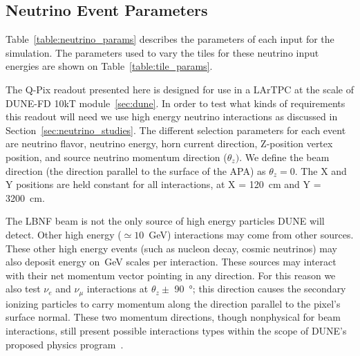 \subsection{Neutrino Event Parameters}

Table~\ref{table:neutrino_params} describes the parameters of each input for the simulation.
The parameters used to vary the tiles for these neutrino input energies are shown on Table~\ref{table:tile_params}.

The Q-Pix readout presented here is designed for use in a LArTPC at the scale of DUNE-FD 10kT module~\ref{sec:dune}.
In order to test what kinds of requirements this readout will need we use high energy neutrino interactions as discussed in Section~\ref{sec:neutrino_studies}.
The different selection parameters for each event are neutrino flavor, neutrino energy, horn current direction, Z-position vertex position, and source neutrino momentum direction ($\theta_{z})$.
We define the beam direction (the direction parallel to the surface of the APA) as $\theta_{z} = 0$.
The X and Y positions are held constant for all interactions, at X = 120~\unit{cm} and Y = 3200~\unit{cm}.

The LBNF beam is not the only source of high energy particles DUNE will detect.
Other high energy ($\simeq 10$~\unit{GeV}) interactions may come from other sources.
These other high energy events (such as nucleon decay, cosmic neutrinos) may also deposit energy on~\unit{GeV} scales per interaction.
These sources may interact with their net momentum vector pointing in any direction.
For this reason we also test $\nu_{e}$ and $\nu_{\mu}$ interactions at $\theta_{z} \pm$ 90~\unit{\degree}; this direction causes the secondary ionizing particles to carry momentum along the direction parallel to the pixel's surface normal.
These two momentum directions, though nonphysical for beam interactions, still present possible interactions types within the scope of DUNE's proposed physics program~\citep{DUNE_TDRv3_Abi_2020}.

